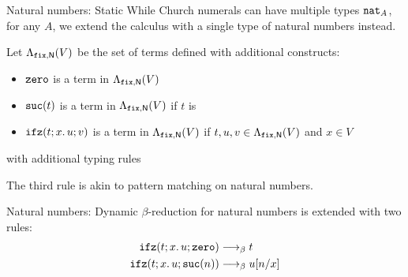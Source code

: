 \begin{frame}{Natural numbers: Static}
  While Church numerals can have multiple types $\mathtt{nat}_A$, for any $A$, we extend the calculus with a single type of natural numbers instead.

  Let $\Lambda_{\mathtt{fix}, \mathsf{N}}(V)$ be the set of terms defined with additional constructs:
  \begin{itemize}
    \item $\mathtt{zero}$ is a term in $\Lambda_{\mathtt{fix}, \mathsf{N}}(V)$
    \item $\mathtt{suc}(t)$ is a term in $\Lambda_{\mathtt{fix}, \mathsf{N}}(V)$ if $t$ is
    \item $\mathtt{ifz}(t; x.\,u; v)$ is a term in $\Lambda_{\mathtt{fix}, \mathsf{N}}(V)$ if $t, u, v \in \Lambda_{\mathtt{fix}, \mathsf{N}}(V)$ and $x \in V$
  \end{itemize}
  with additional typing rules

  The third rule is akin to pattern matching on natural numbers.
\end{frame}

\begin{frame}{Natural numbers: Dynamic}
  $\beta$-reduction for natural numbers is extended with two rules:
  \begin{align*}
    \mathtt{ifz}(t; x.\, u;\mathtt{zero})   & \longrightarrow_{\beta} t \\
    \mathtt{ifz}(t; x.\, u;\mathtt{suc}(n)) & \longrightarrow_{\beta} u[{n}/{x}]
  \end{align*}
\end{frame}


